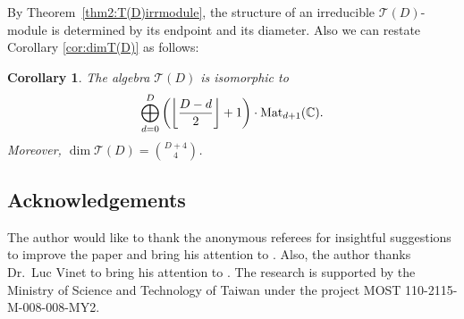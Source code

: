 \documentclass[pdftex]{sigma}%
\def\C{\mathbb C}
\def\Mat{{\rm Mat}}
\def\T{\mathcal T}
\numberwithin{equation}{section}
\newtheorem{Corollary}[Theorem]{Corollary}
\begin{document}
By Theorem~\ref{thm2:T(D)irrmodule}, the structure of an irreducible $\T(D)$-module is determined by its endpoint and its diameter. Also we can restate Corollary \ref{cor:dimT(D)} as follows:
\begin{Corollary}%
The algebra $\T(D)$ is isomorphic to
\[
\bigoplus_{d=0}^D\bigg(\bigg\lfloor \frac{D-d}{2}\bigg\rfloor+1\bigg)\cdot\Mat_{d+1}(\C).
\]
Moreover, $\dim \T(D)={D+4\choose 4}$.
\end{Corollary}

\subsection*{Acknowledgements}
The author would like to thank the anonymous referees for insightful suggestions to improve the paper and bring his attention to \cite{K&sl2}. Also, the author thanks Dr.\ Luc Vinet to bring his attention to \cite{Johnson:2021, Hamming:2021,Hamming:2015}.
The research is supported by the Ministry of Science and Technology of Taiwan under the project MOST 110-2115-M-008-008-MY2.
\end{document}
